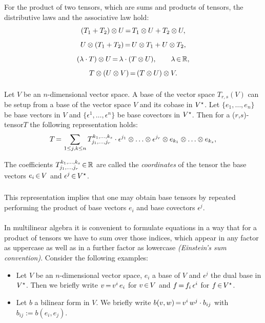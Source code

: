 \documentclass[11pt,twoside]{article}
\begin{document}
\subparagraph{}
For the product of two tensors, which are sums and products of tensors,
the distributive laws and the associative law hold:
\[
( T_1 + T_2 ) \otimes U {\,=\,} T_1 \otimes U + T_2 \otimes U,
\]
\[
U \otimes ( T_1 + T_2 ) {\,=\,} U \otimes T_1 + U \otimes T_2,
\]
\[
( \lambda \cdot T ) \otimes U {\,=\,} \lambda \cdot ( T \otimes U ), \qquad
\lambda {\,\in\,} {\mathbb{R}},
\]
\[
T \otimes ( U \otimes V ) {\,=\,} ( T \otimes U ) \otimes V.
\]

\paragraph{}
Let $V$ be an $n$-dimensional vector space.
A base of the vector space $T_{r,s}(V)$ can be setup from a base of the
vector space $V$ and its cobase in $V^\star$. 
Let $\{e_1,\ldots,e_n\}$ be base vectors in $V$ and 
$\{\epsilon^1,\ldots,\epsilon^n\}$ be base covectors in $V^\star$. 
Then for a ($r$,$s$)-tensor$T$ the following representation holds:
\[
T {\,=\,} \sum_{1 \leq j,k \leq n} 
T_{j_1,\ldots,j_r}^{k_1,\ldots,k_s} \cdot 
\epsilon^{j_1} \otimes \ldots \otimes \epsilon^{j_r} \otimes
e_{k_1} \otimes \ldots \otimes e_{k_s},
\]

\begin{definition}
The coefficients $T_{j_1,\ldots,j_r}^{k_1,\ldots,k_s} {\,\in\,} {\mathbb{R}}$ are called
the \textit{coordinates} of the tensor {\wrt} the base vectors 
$e_i {\,\in\,} V$ and $\epsilon^j {\,\in\,} V^\star$.
\end{definition}

\subparagraph{}
This representation implies
that one may obtain base tensors by repeated performing the product
of base vectors $e_i$ and base covectors $\epsilon^j$.

\paragraph{}
In multilinear algebra it is convenient
to formulate equations in a way
that for a product of tensors we have to sum over those indices,
which appear in any factor as uppercase as well as
in a further factor as lowercase \textit{(Einstein's sum convention)}.
Consider the following examples:

\begin{itemize}[leftmargin=15pt]
\item[1.]
Let $V$ be an $n$-dimensional vector space, $e_i$ a base of $V$ and 
$\epsilon^j$ the dual base in $V^\star$.
Then we briefly write $v {\,=\,} v^i \, e_i$ for $v {\,\in\,} V$ and
$f {\,=\,} f_i \, \epsilon^i$ for $f {\,\in\,} V^\star$.

\item[2.]
Let $b$ a bilinear form in $V$.
We briefly write 
$b(v,w) {\,=\,} v^i \, w^j \cdot b_{ij}$ with $b_{ij} := b(e_i,e_j)$.
\end{itemize}
\end{document}
